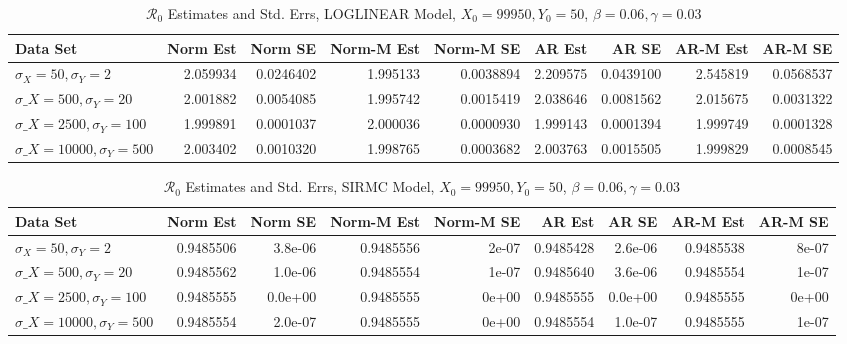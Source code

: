\documentclass[12pt]{article}
\newcommand{\rr}{\ensuremath{\mathcal{R}_0}}
\begin{document}
\begin{table}[H]
	
	\caption{\label{tab:}$\rr$ Estimates and Std. Errs, LOGLINEAR Model,
		$X_0 = 99950, Y_0 = 50$, $\beta = 0.06, \gamma = 0.03$}
	\centering
	\begin{footnotesize}
	\begin{tabular}[t]{l|r|r|r|r|r|r|r|r}
		\hline
		Data Set & Norm Est & Norm SE & Norm-M Est & Norm-M SE & AR Est & AR SE & AR-M Est & AR-M SE\\
		\hline
		$\sigma_X = 50, \sigma_Y = 2$ & 2.059934 & 0.0246402 & 1.995133 & 0.0038894 & 2.209575 & 0.0439100 & 2.545819 & 0.0568537\\
		\hline
		$\sigma\_X = 500, \sigma_Y = 20$ & 2.001882 & 0.0054085 & 1.995742 & 0.0015419 & 2.038646 & 0.0081562 & 2.015675 & 0.0031322\\
		\hline
		$\sigma\_X = 2500, \sigma_Y = 100$ & 1.999891 & 0.0001037 & 2.000036 & 0.0000930 & 1.999143 & 0.0001394 & 1.999749 & 0.0001328\\
		\hline
		$\sigma\_X = 10000, \sigma_Y = 500$ & 2.003402 & 0.0010320 & 1.998765 & 0.0003682 & 2.003763 & 0.0015505 & 1.999829 & 0.0008545\\
		\hline
	\end{tabular}
\end{footnotesize}
\end{table}
\begin{table}[H]
	
	\caption{\label{tab:}$\rr$ Estimates and Std. Errs, SIRMC Model,
		$X_0 = 99950, Y_0 = 50$, $\beta = 0.06, \gamma = 0.03$}
	\centering
	\begin{footnotesize}
	\begin{tabular}[t]{l|r|r|r|r|r|r|r|r}
		\hline
		Data Set & Norm Est & Norm SE & Norm-M Est & Norm-M SE & AR Est & AR SE & AR-M Est & AR-M SE\\
		\hline
		$\sigma_X = 50, \sigma_Y = 2$ & 0.9485506 & 3.8e-06 & 0.9485556 & 2e-07 & 0.9485428 & 2.6e-06 & 0.9485538 & 8e-07\\
		\hline
		$\sigma\_X = 500, \sigma_Y = 20$ & 0.9485562 & 1.0e-06 & 0.9485554 & 1e-07 & 0.9485640 & 3.6e-06 & 0.9485554 & 1e-07\\
		\hline
		$\sigma\_X = 2500, \sigma_Y = 100$ & 0.9485555 & 0.0e+00 & 0.9485555 & 0e+00 & 0.9485555 & 0.0e+00 & 0.9485555 & 0e+00\\
		\hline
		$\sigma\_X = 10000, \sigma_Y = 500$ & 0.9485554 & 2.0e-07 & 0.9485555 & 0e+00 & 0.9485554 & 1.0e-07 & 0.9485555 & 1e-07\\
		\hline
	\end{tabular}
\end{footnotesize}
\end{table}
\end{document}
